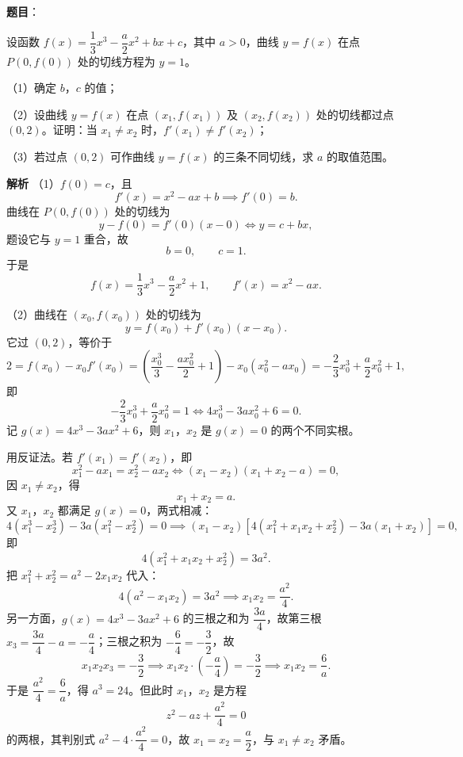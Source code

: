\begin{answer}

\textbf{题目}：

设函数 $f(x)=\dfrac13x^3-\dfrac a2x^2+bx+c$，其中 $a>0$，曲线 $y=f(x)$ 在点 $P(0,f(0))$ 处的切线方程为 $y=1$。

（1）确定 $b$，$c$ 的值；

（2）设曲线 $y=f(x)$ 在点 $(x_1,f(x_1))$ 及 $(x_2,f(x_2))$ 处的切线都过点 $(0,2)$。证明：当 $x_1\neq x_2$ 时，$f'(x_1)\neq f'(x_2)$；

（3）若过点 $(0,2)$ 可作曲线 $y=f(x)$ 的三条不同切线，求 $a$ 的取值范围。

\textbf{解析}
（1）$f(0)=c$，且
\nopagebreak[4]
\[f'(x)=x^2-ax+b\implies f'(0)=b.\]
曲线在 $P(0,f(0))$ 处的切线为
\nopagebreak[4]
\[y-f(0)=f'(0)(x-0)\iff y=c+bx,\]
题设它与 $y=1$ 重合，故
\nopagebreak[4]
\[b=0,\qquad c=1.\]
于是
\nopagebreak[4]
\[f(x)=\frac13x^3-\frac a2x^2+1,\qquad f'(x)=x^2-ax.\]

（2）曲线在 $(x_0,f(x_0))$ 处的切线为
\nopagebreak[4]
\[y=f(x_0)+f'(x_0)(x-x_0).\]
它过 $(0,2)$，等价于
\nopagebreak[4]
\[2=f(x_0)-x_0f'(x_0)=\left(\frac{x_0^3}{3}-\frac{a x_0^2}{2}+1\right)-x_0\left(x_0^2-ax_0\right)
=-\frac23x_0^3+\frac a2x_0^2+1,\]
即
\nopagebreak[4]
\[-\frac23x_0^3+\frac a2x_0^2=1\iff 4x_0^3-3ax_0^2+6=0.\]
记 $g(x)=4x^3-3ax^2+6$，则 $x_1$，$x_2$ 是 $g(x)=0$ 的两个不同实根。

用反证法。若 $f'(x_1)=f'(x_2)$，即
\nopagebreak[4]
\[x_1^2-ax_1=x_2^2-ax_2\iff(x_1-x_2)(x_1+x_2-a)=0,\]
因 $x_1\ne x_2$，得
\nopagebreak[4]
\[x_1+x_2=a.\]
又 $x_1$，$x_2$ 都满足 $g(x)=0$，两式相减：
\nopagebreak[4]
\[4\left(x_1^3-x_2^3\right)-3a\left(x_1^2-x_2^2\right)=0
\implies(x_1-x_2)\left[4\left(x_1^2+x_1x_2+x_2^2\right)-3a(x_1+x_2)\right]=0,\]
即
\nopagebreak[4]
\[4\left(x_1^2+x_1x_2+x_2^2\right)=3a^2.\]
把 $x_1^2+x_2^2=a^2-2x_1x_2$ 代入：
\nopagebreak[4]
\[4\left(a^2-x_1x_2\right)=3a^2\implies x_1x_2=\frac{a^2}{4}.\]
另一方面，$g(x)=4x^3-3ax^2+6$ 的三根之和为 $\dfrac{3a}{4}$，故第三根 $x_3=\dfrac{3a}{4}-a=-\dfrac a4$；三根之积为 $-\dfrac64=-\dfrac32$，故
\nopagebreak[4]
\[x_1x_2x_3=-\frac32\implies x_1x_2\cdot\left(-\frac a4\right)=-\frac32\implies x_1x_2=\frac6a.\]
于是 $\dfrac{a^2}{4}=\dfrac6a$，得 $a^3=24$。但此时 $x_1$，$x_2$ 是方程
\nopagebreak[4]
\[z^2-az+\frac{a^2}{4}=0\]
的两根，其判别式 $a^2-4\cdot\dfrac{a^2}{4}=0$，故 $x_1=x_2=\dfrac a2$，与 $x_1\ne x_2$ 矛盾。


\end{answer}
